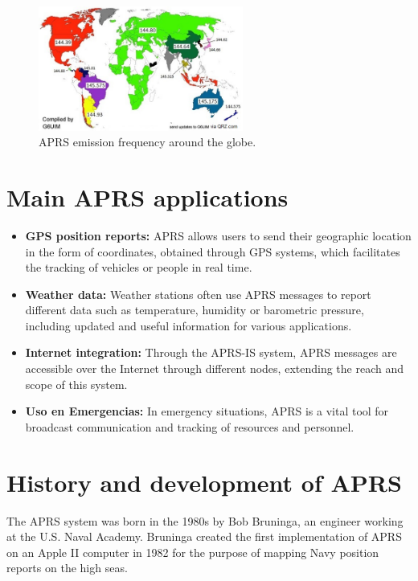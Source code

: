 \begin{figure}[h]
	\centering
	\includegraphics[width=0.6\textwidth]{Imagenes/Chapter_1/mapa_frecuencias_aprs.jpg}
	\caption{APRS emission frequency around the globe.}
	\label{fig:freq-map-en}
\end{figure}


\section{Main APRS applications}

\begin{itemize}
	\item \textbf{GPS position reports:} APRS allows users to send their geographic location in the form of coordinates, obtained through GPS systems, which facilitates the tracking of vehicles or people in real time.

	\item \textbf{Weather data:} Weather stations often use APRS messages to report different data such as temperature, humidity or barometric pressure, including updated and useful information for various applications.

	\item \textbf{Internet integration:} Through the APRS-IS system, APRS messages are accessible over the Internet through different nodes, extending the reach and scope of this system.

	\item \textbf{Uso en Emergencias:} In emergency situations, APRS is a vital tool for broadcast communication and tracking of resources and personnel.
\end{itemize}

\section{History and development of APRS}

The APRS system was born in the 1980s by Bob Bruninga, an engineer working at the U.S. Naval Academy. Bruninga created the first implementation of APRS on an Apple II computer in 1982 for the purpose of mapping Navy position reports on the high seas.\cite{APRSOrigins}

